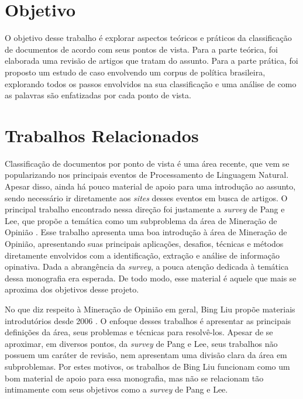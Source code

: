
\section{Objetivo}
\label{objetivo}

O objetivo desse trabalho é explorar aspectos teóricos e práticos da classificação de documentos de acordo com seus pontos de vista. Para a parte teórica, foi elaborada uma revisão de artigos que tratam do assunto. Para a parte prática, foi proposto um estudo de caso envolvendo um corpus de política brasileira, explorando todos os passos envolvidos na sua classificação e uma análise de como as palavras são enfatizadas por cada ponto de vista.

\section{Trabalhos Relacionados}
\label{relacionados}

Classificação de documentos por ponto de vista é uma área recente, que vem se popularizando nos principais eventos de Processamento de Linguagem Natural. Apesar disso, ainda há pouco material de apoio para uma introdução ao assunto, sendo necessário ir diretamente aos \emph{sites} desses eventos em busca de artigos. O principal trabalho encontrado nessa direção foi justamente a \emph{survey} de Pang e Lee, que propõe a temática como um subproblema da área de Mineração de Opinião \cite{omsa}. Esse trabalho apresenta uma boa introdução à área de Mineração de Opinião, apresentando suas principais aplicações, desafios, técnicas e métodos diretamente envolvidos com a identificação, extração e análise de informação opinativa. Dada a abrangência da \emph{survey}, a pouca atenção dedicada à temática dessa monografia era esperada. De todo modo, esse material é aquele que mais se aproxima dos objetivos desse projeto.

No que diz respeito à Mineração de Opinião em geral, Bing Liu propõe materiais introdutórios desde 2006 \cite{bingliu} \cite{handbook-liu}. O enfoque desses trabalhos é apresentar as principais definições da área, seus problemas e técnicas para resolvê-los. Apesar de se aproximar, em diversos pontos, da \emph{survey} de Pang e Lee, seus trabalhos não possuem um caráter de revisão, nem apresentam uma divisão clara da área em subproblemas. Por estes motivos, os trabalhos de Bing Liu funcionam como um bom material de apoio para essa monografia, mas não se relacionam tão intimamente com seus objetivos como a \emph{survey} de Pang e Lee.


